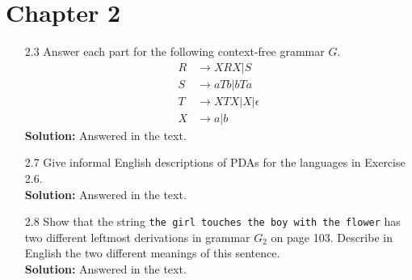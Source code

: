 \section{Chapter 2}

\begin{enumerate}
\item[2.3]Answer each part for the following context-free grammar $G$.
\begin{align*}
R &\rightarrow XRX | S \\
S &\rightarrow aTb | bTa \\
T &\rightarrow XTX | X | \epsilon \\
X &\rightarrow a | b
\end{align*}
\textbf{Solution:} Answered in the text.

\item[2.7]Give informal English descriptions of PDAs for the languages in Exercise 2.6.
\\
\textbf{Solution:} Answered in the text.

\item[2.8]Show that the string \verb|the girl touches the boy with the flower| has two different leftmost derivations in grammar $G_2$ on page 103. Describe in English the two different meanings of this sentence.
\\
\textbf{Solution:} Answered in the text.

\end{enumerate}